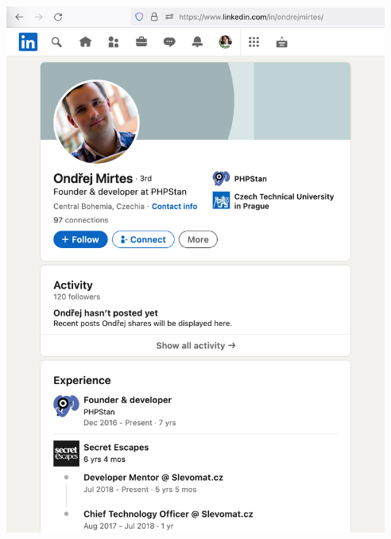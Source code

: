 
\begin{center}
    \includegraphics[width=34em]{mirtes-linkedin-p1}
\end{center}
\WillContinue
\pagebreak

